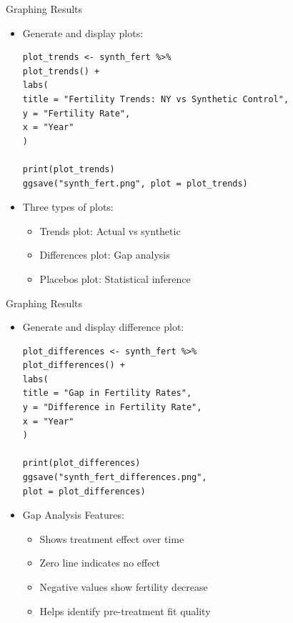\documentclass[hyperref={pdfpagelabels=false}]{beamer}
\begin{document}
\begin{frame}[fragile]{Graphing Results}
\begin{itemize}
\item Generate and display plots:
\vspace{0.2cm}
\begin{lstlisting}
plot_trends <- synth_fert %>%
plot_trends() +
labs(
title = "Fertility Trends: NY vs Synthetic Control",
y = "Fertility Rate",
x = "Year"
)

print(plot_trends)  
ggsave("synth_fert.png", plot = plot_trends)
\end{lstlisting}
\item Three types of plots:
\begin{itemize}
\item Trends plot: Actual vs synthetic
\item Differences plot: Gap analysis
\item Placebos plot: Statistical inference
\end{itemize}
\end{itemize}
\end{frame}


\begin{frame}[fragile]{Graphing Results}
\begin{itemize}
	\item Generate and display difference plot:
	\vspace{0.2cm}
\begin{lstlisting}
plot_differences <- synth_fert %>%
plot_differences() +
labs(
title = "Gap in Fertility Rates",
y = "Difference in Fertility Rate",
x = "Year"
)

print(plot_differences)
ggsave("synth_fert_differences.png", 
plot = plot_differences)
\end{lstlisting}
	\item Gap Analysis Features:
	\begin{itemize}
		\item Shows treatment effect over time
		\item Zero line indicates no effect
		\item Negative values show fertility decrease
		\item Helps identify pre-treatment fit quality
	\end{itemize}
\end{itemize}
\end{frame}
\end{document}
